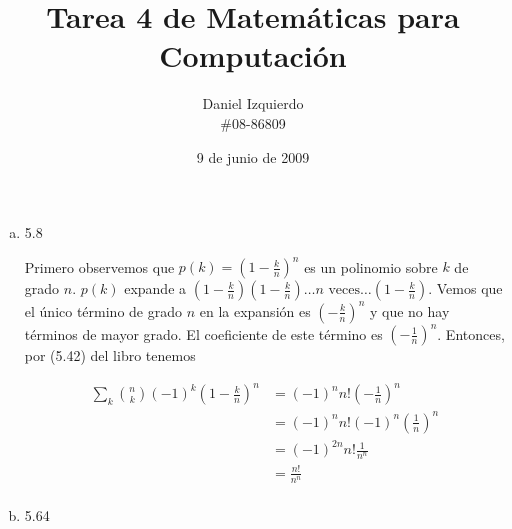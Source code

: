 \documentclass{article}
\begin{document}

\title{Tarea 4 de Matemáticas para Computación}
\author{Daniel Izquierdo \\ \#08-86809}
\date{9 de junio de 2009}

\maketitle

\section{}

\begin{enumerate}[a.]

 \item 5.8

Primero observemos que $p(k) = (1-\frac{k}{n})^n$ es un polinomio sobre $k$ de
grado $n$. $p(k)$ expande a
$(1-\frac{k}{n})(1-\frac{k}{n})\ldots n \text{ veces} \ldots(1-\frac{k}{n})$.
Vemos que el único término de grado $n$ en la expansión es $(-\frac{k}{n})^n$
y que no hay términos de mayor grado. El coeficiente de este término es
$(-\frac{1}{n})^n$. Entonces, por (5.42) del libro tenemos

\begin{align*}
\sum_k \binom{n}{k} (-1)^k (1-\frac{k}{n})^n & = (-1)^n n! (-\frac{1}{n})^n\\
                                             & = (-1)^n n! (-1)^n (\frac{1}{n})^n\\
                                             & = (-1)^{2n} n! \frac{1}{n^n}\\
                                             & = \frac{n!}{n^n}\\
\end{align*}

 \newpage
 \item 5.64


\end{enumerate}
\end{document}
